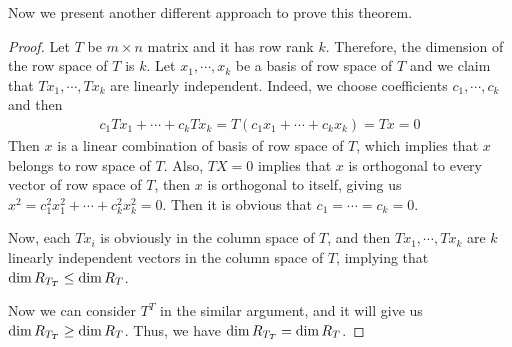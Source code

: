 \documentclass[11pt]{book}
\theoremstyle{definition}
\numberwithin{equation}{chapter}
\begin{document}
Now we present another different approach to prove this theorem.

\begin{proof}
Let $T$ be $m\times n$ matrix and it has row rank $k$. Therefore, the dimension of the row space of $T$ is $k$. Let $x_1,\cdots,x_k$ be a basis of row space of $T$ and we claim that $Tx_1,\cdots, Tx_k$ are linearly independent. Indeed, we choose coefficients $c_1,\cdots,c_k$ and then 
\begin{align*}
    c_1 Tx_1 + \cdots + c_k Tx_k = T(c_1x_1 +\cdots + c_kx_k) = Tx = 0
\end{align*}
Then $x$ is a linear combination of basis of row space of $T$, which implies that $x$ belongs to row space of $T$. Also, $TX = 0$ implies that $x$ is orthogonal to every vector of row space of $T$, then $x$ is orthogonal to itself, giving us $x^2 = c_1^2 x_1^2 + \cdots + c_k^2 x_k^2 = 0$. Then it is obvious that $c_1 = \cdots = c_k = 0$.

Now, each $Tx_i$ is obviously in the column space of $T$, and then $Tx_1,\cdots, Tx_k$ are $k$ linearly independent vectors in the column space of $T$, implying that ${\rm dim}\, R_{T_T}\leq {\rm dim}\,R_T$. 

Now we can consider $T^T$ in the similar argument, and it will give us ${\rm dim}\, R_{T_T}\geq {\rm dim}\,R_T$. Thus, we have ${\rm dim}\, R_{T_T} = {\rm dim}\,R_T$. 
\end{proof}

\medskip
\end{document}
